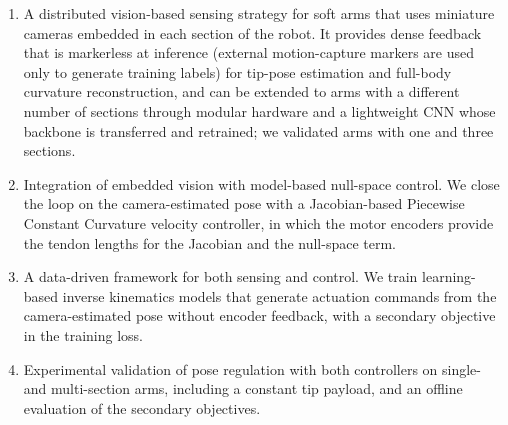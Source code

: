 \begin{enumerate}
\item A distributed vision-based sensing strategy for soft arms that uses miniature cameras embedded in each section of the robot. It provides dense feedback that is markerless at inference (external motion-capture markers are used only to generate training labels) for tip-pose estimation and full-body curvature reconstruction, and can be extended to arms with a different number of sections through modular hardware and a lightweight CNN whose backbone is transferred and retrained; we validated arms with one and three sections.
\item Integration of embedded vision with model-based null-space control. We close the loop on the camera-estimated pose with a Jacobian-based Piecewise Constant Curvature velocity controller, in which the motor encoders provide the tendon lengths for the Jacobian and the null-space term.
\item A data-driven framework for both sensing and control. We train learning-based inverse kinematics models that generate actuation commands from the camera-estimated pose without encoder feedback, with a secondary objective in the training loss.
\item Experimental validation of pose regulation with both controllers on single- and multi-section arms, including a constant tip payload, and an offline evaluation of the secondary objectives.
\end{enumerate}
